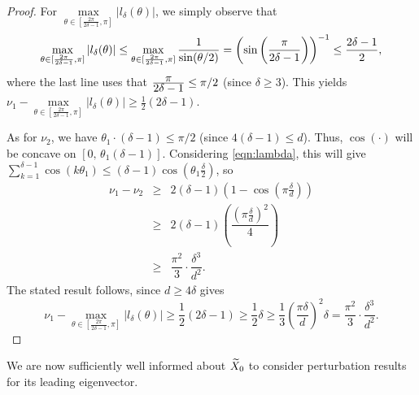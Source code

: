 \begin{proof}
For $\max\limits_{\theta \in [\frac{2\pi}{2\delta-1}, \pi]} |l_\delta(\theta)|$, we simply observe that \[\max\limits_{\theta \in [\frac{2\pi}{2\delta-1}, \pi]} |l_\delta(\theta)| \le \max\limits_{\theta \in [\frac{2\pi}{2\delta-1}, \pi]} \dfrac{1}{\sin(\theta / 2)} = \left( \sin \left(\frac{\pi}{2\delta - 1} \right) \right)^{-1}  \le \frac{\displaystyle 2\delta - 1}{\displaystyle 2},\] where the last line uses that $\frac{\displaystyle \pi}{\displaystyle 2\delta - 1} \le \pi / 2$ (since $\delta \ge 3$).  This yields $\nu_1 - \max\limits_{\theta \in [\frac{2\pi}{2\delta-1}, \pi]} |l_\delta(\theta)| \ge \frac{1}{2}(2 \delta - 1)$.

As for $\nu_2$, we have $\theta_1 \cdot (\delta - 1) \le \pi / 2$ (since $4(\delta - 1) \le d$). Thus, $\cos(\cdot)$ will be concave on $[0,\, \theta_1(\delta-1)]$.  Considering \eqref{eqn:lambda}, this will give $\sum_{k=1}^{\delta - 1}\cos(k\theta_1) \le (\delta - 1) \cos \left(\theta_1 \frac{\delta}{2} \right)$, so \[\begin{array}{rcl}
  \nu_1 - \nu_2 & \ge & 2(\delta - 1) \left(1 - \cos \left(\pi\frac{\delta}{d} \right) \right)\\
  & \ge & 2(\delta - 1) \left(\dfrac{(\pi \frac{\delta}{d})^2}{4}\right) \\
  & \ge & \dfrac{\pi^2}{3} \cdot \dfrac{\delta^3}{d^2}.
\end{array}\]
The stated result follows, since $d \ge 4 \delta$ gives \[\nu_1 - \max\limits_{\theta \in [\frac{2\pi}{2\delta-1}, \pi]} |l_\delta(\theta)| \ge \frac{1}{2}(2 \delta - 1) \ge \dfrac{1}{2} \delta \ge \dfrac{1}{3}\left(\dfrac{\pi \delta}{d}\right)^2 \delta = \dfrac{\pi^2}{3} \cdot \dfrac{\delta^3}{d^2}.\]
\end{proof}

We are now sufficiently well informed about $\widetilde{X}_0$ to consider perturbation results for its leading eigenvector.
